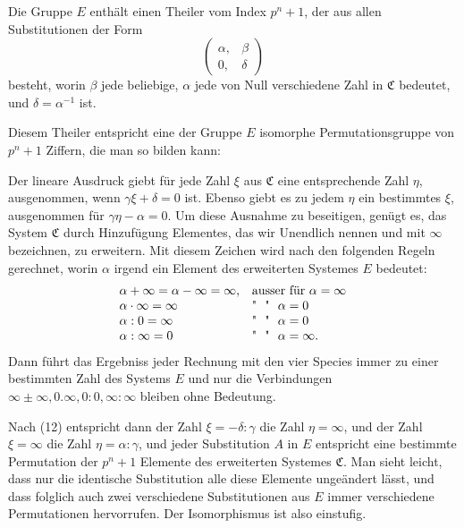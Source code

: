 Die Gruppe $E$ enth\"alt einen Theiler vom Index $p^n + 1$, der aus allen Substitutionen der Form
\[ \begin{pmatrix} \alpha, & \beta \\ 0, & \delta \end{pmatrix} \]
besteht, worin $\beta$ jede beliebige, $\alpha$ jede von Null verschiedene Zahl in $\mathfrak{C}$ bedeutet, und $\delta = \alpha^{-1}$ ist.

Diesem Theiler entspricht eine der Gruppe $E$ isomorphe Permutationsgruppe von $p^n + 1$ Ziffern, die man so bilden kann:

Der lineare Ausdruck
giebt f\"ur jede Zahl $\xi$ aus $\mathfrak{C}$ eine entsprechende Zahl $\eta$, ausgenommen, wenn $\gamma\xi + \delta = 0$ ist. Ebenso giebt es zu jedem $\eta$ ein bestimmtes $\xi$, ausgenommen f\"ur $\gamma\eta - \alpha = 0$. Um diese Ausnahme zu beseitigen, gen\"ugt es, das System $\mathfrak{C}$ durch Hinzuf\"ugung  Elementes, das wir \glqq Unendlich\grqq{} nennen und mit $\infty$ bezeichnen, zu erweitern. Mit diesem Zeichen wird nach den folgenden Regeln gerechnet, worin $\alpha$ irgend ein Element des erweiterten Systemes $E$ bedeutet:
\[
\begin{array}{l@{\quad}l}
\alpha + \infty = \alpha - \infty = \infty, & \text{ausser f\"ur } \alpha = \infty \\
\alpha \cdot \infty = \infty & \text{\textquotedbl}\ \ \text{\textquotedbl}\ \ \alpha = 0 \\
\alpha : 0 = \infty & \text{\textquotedbl}\ \ \text{\textquotedbl}\ \ \alpha = 0 \\
\alpha : \infty = 0 & \text{\textquotedbl}\ \ \text{\textquotedbl}\ \ \alpha = \infty.
\end{array}
\]
Dann f\"uhrt das Ergebniss jeder Rechnung mit den vier Species immer zu einer bestimmten Zahl des Systems $E$ und nur die Verbindungen $\infty \pm \infty, 0 . \infty, 0 : 0, \infty : \infty$ bleiben ohne Bedeutung.

Nach (12) entspricht dann der Zahl $\xi = -\delta : \gamma$ die Zahl $\eta = \infty$, und der Zahl $\xi = \infty$ die Zahl $\eta = \alpha : \gamma$, und jeder Substitution $A$ in $E$ entspricht eine bestimmte Permutation der $p^n + 1$ Elemente des erweiterten Systemes $\mathfrak{C}$. Man sieht leicht, dass nur die identische Substitution alle diese Elemente unge\"andert l\"asst, und dass folglich auch zwei verschiedene Substitutionen aus $E$ immer verschiedene Permutationen hervorrufen. Der Isomorphismus ist also einstufig.
